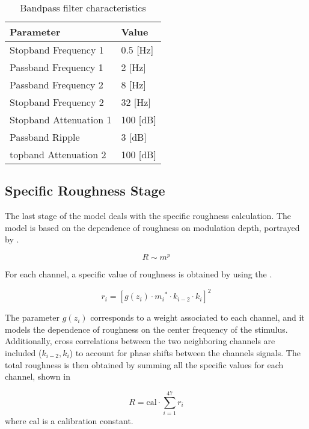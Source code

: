 \documentclass[../main.tex]{subfiles}
\begin{document}
\begin{modelchapter}
\begin{table}[!ht]
  \centering
  \begin{tabu} to \linewidth{XX}
    \toprule
    \rowfont\bfseries
    Parameter & Value \\
    \midrule
    Stopband Frequency 1 & 0.5 [Hz] \\
    Passband Frequency 1 & 2 [Hz] \\
    Passband Frequency 2 & 8 [Hz] \\
    Stopband Frequency 2 & 32 [Hz] \\
    Stopband Attenuation 1 & 100 [dB] \\
    Passband Ripple & 3 [dB] \\
    topband Attenuation 2 & 100 [dB] \\
    \bottomrule
  \end{tabu}
  \caption{Bandpass filter characteristics}
\label{tab:bandpass_filter}
\end{table}

\subsection{Specific Roughness Stage}

The last stage of the model deals with the specific roughness calculation. The
model is based on the dependence of roughness on modulation depth, portrayed
by .

\begin{equation}
  R \sim m^p
  \label{eq:roughness_modulation_depth}
\end{equation}

For each channel, a specific value of roughness is obtained by using the
.

\begin{equation}
  r_i = [g(z_i) \cdot {m_i}^* \cdot k_{i-2} \cdot k_i]^2
  \label{eq:ri}
\end{equation}

The parameter $g(z_i)$ corresponds to a weight associated to each channel, and
it models the dependence of roughness on the center frequency of the stimulus.
Additionally, cross correlations between the two neighboring channels are
included ($k_{i-2}, k_i$) to account for phase shifts between the channels
signals. The total roughness is then obtained by summing all the specific
values for each channel, shown in 

\begin{equation}
  R = \text{cal} \cdot \displaystyle\sum_{i=1}^{47} r_i
  \label{eq:total_roughness}
\end{equation}
where cal is a calibration constant.


\end{modelchapter}
\end{document}
